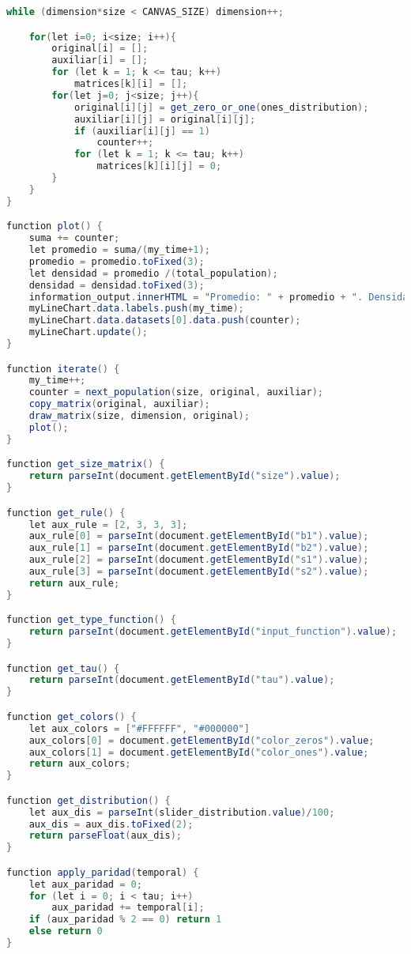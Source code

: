\documentclass[a4paper,12pt]{article}
\begin{document}
\begin{lstlisting}[language=Java]
    while (dimension*size < CANVAS_SIZE) dimension++;

    for(let i=0; i<size; i++){
        original[i] = [];
        auxiliar[i] = [];
        for (let k = 1; k <= tau; k++)
            matrices[k][i] = [];
        for(let j=0; j<size; j++){
            original[i][j] = get_zero_or_one(ones_distribution);
            auxiliar[i][j] = original[i][j];
            if (auxiliar[i][j] == 1)
                counter++;
            for (let k = 1; k <= tau; k++)
                matrices[k][i][j] = 0;
        }
    }
}

function plot() {
    suma += counter;
    let promedio = suma/(my_time+1);
    promedio = promedio.toFixed(3);
    let densidad = promedio /(total_population);
    densidad = densidad.toFixed(3);
    information_output.innerHTML = "Promedio: " + promedio + ". Densidad: " + densidad;
    myLineChart.data.labels.push(my_time);
    myLineChart.data.datasets[0].data.push(counter);
    myLineChart.update();
}

function iterate() {
    my_time++;
    counter = next_population(size, original, auxiliar);
    copy_matrix(original, auxiliar);
    draw_matrix(size, dimension, original);
    plot();
}

function get_size_matrix() {
    return parseInt(document.getElementById("size").value);
}

function get_rule() {
    let aux_rule = [2, 3, 3, 3];
    aux_rule[0] = parseInt(document.getElementById("b1").value);
    aux_rule[1] = parseInt(document.getElementById("b2").value);
    aux_rule[2] = parseInt(document.getElementById("s1").value);
    aux_rule[3] = parseInt(document.getElementById("s2").value);
    return aux_rule;
}

function get_type_function() {
    return parseInt(document.getElementById("input_function").value);
}

function get_tau() {
    return parseInt(document.getElementById("tau").value);
}

function get_colors() {
    let aux_colors = ["#FFFFFF", "#000000"]
    aux_colors[0] = document.getElementById("color_zeros").value;
    aux_colors[1] = document.getElementById("color_ones").value;
    return aux_colors;
}

function get_distribution() {
    let aux_dis = parseInt(slider_distribution.value)/100;
    aux_dis = aux_dis.toFixed(2);
    return parseFloat(aux_dis);
}

function apply_paridad(temporal) {
    let aux_paridad = 0;
    for (let i = 0; i < tau; i++)
        aux_paridad += temporal[i];
    if (aux_paridad % 2 == 0) return 1
    else return 0
}


\end{lstlisting}
\end{document}
